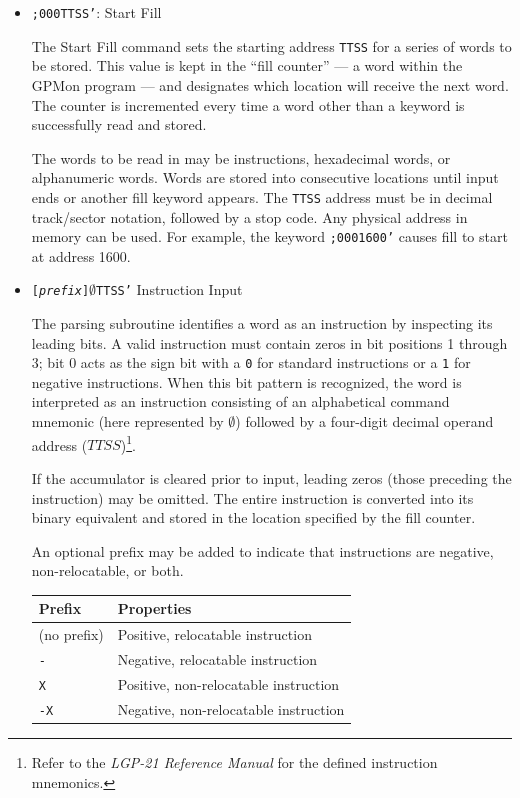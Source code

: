 \begin{itemize}
\item \texttt{;000TTSS'}: Start Fill 

The Start Fill command sets the starting address \texttt{TTSS} for a series of words to be stored. This value is kept in the ``fill counter'' --- a word within the GPMon program --- and designates which location will receive the next word. The counter is incremented every time a word other than a keyword is successfully read and stored.

The words to be read in may be instructions, hexadecimal words, or alphanumeric words. Words are stored into consecutive locations until input ends or another fill keyword appears. The \texttt{TTSS} address must be in decimal track/sector notation, followed by a stop code. Any physical address in memory can be used. For example, the keyword \texttt{;0001600'} causes fill to start at address 1600.

\item \texttt{[\textit{prefix}]$\emptyset$TTSS'} Instruction Input

The parsing subroutine identifies a word as an instruction by inspecting its leading bits. A valid instruction must contain zeros in bit positions 1 through 3; bit 0 acts as the sign bit with a \texttt{0} for standard instructions or a \texttt{1} for negative instructions. When this bit pattern is recognized, the word is interpreted as an instruction consisting of an alphabetical command mnemonic (here represented by $\emptyset$) followed by a four-digit decimal operand address ($TTSS$)\footnote{Refer to the \textit{LGP-21 Reference Manual}\cite{lgp21referencemanual} for the defined instruction mnemonics.}.

If the accumulator is cleared prior to input, leading zeros (those preceding the instruction) may be omitted. The entire instruction is converted into its binary equivalent and stored in the location specified by the fill counter.

An optional prefix may be added to indicate that instructions are negative, non-relocatable, or both.

\begin{center}
\begin{tabular}{ll}
    \toprule
    Prefix & Properties \\
    \midrule
    (no prefix) & Positive, relocatable instruction \\
    \texttt{-}  & Negative, relocatable instruction \\
    \texttt{X}  & Positive, non-relocatable instruction \\
    \texttt{-X} & Negative, non-relocatable instruction \\
    \bottomrule
\end{tabular}
\end{center}


\end{itemize}
